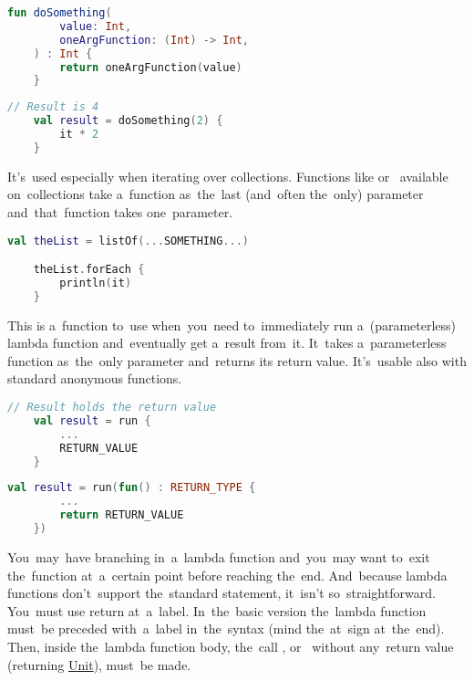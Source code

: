 \example
\begin{lstlisting}[language=Kotlin, title={Function taking other function as the~last parameter, that one takes one parameter}]
    fun doSomething(
        value: Int,
        oneArgFunction: (Int) -> Int,
    ) : Int {
        return oneArgFunction(value)
    }
\end{lstlisting}
\begin{lstlisting}[language=Kotlin, title={Usage}]
    // Result is 4
    val result = doSomething(2) {
        it * 2
    }
\end{lstlisting}
\newline

\noindent It's~used especially when iterating over collections.
Functions like  or~ available on~collections take a~function as~the~last (and~often the~only) parameter and~that~function takes one~parameter.

\begin{lstlisting}[language=Kotlin]
    val theList = listOf(...SOMETHING...)

    theList.forEach {
        println(it)
    }
\end{lstlisting}

\label{kotlinrun}
This is a~function to~use when~you~need to~immediately run a~(parameterless) lambda function and~eventually get a~result from~it.
It~takes a~parameterless function as~the~only parameter and~returns its return value.
It's~usable also with standard anonymous functions.
\newpage

\begin{lstlisting}[language=Kotlin, title={\textit{Run} with lambda function}]
    // Result holds the return value
    val result = run {
        ...
        RETURN_VALUE
    }
\end{lstlisting}
\begin{lstlisting}[language=Kotlin, title={Equivalent with standard anonymous function}]
    val result = run(fun() : RETURN_TYPE {
        ...
        return RETURN_VALUE
    })
\end{lstlisting}

\label{kotlinreturnatlabel}
You~may~have  branching in~a~lambda function and~you~may want to~exit the~function at~a~certain point before reaching the~end.
And~because lambda functions don't~support the~standard  statement, it~isn't so~straightforward.
You~must use return at~a~label.
In~the~basic version the~lambda function must~be preceded with~a~label in~the~syntax  (mind the~at~sign at~the~end).
Then, inside the~lambda function body, the~call , \mbox{or } without any~return value (returning \hyperref[kotlinunit]{Unit}), must~be made.

